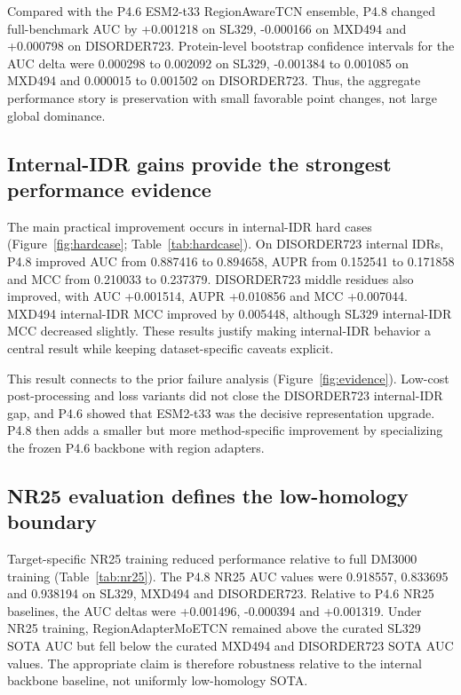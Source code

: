 \documentclass[namedate,webpdf,traditional,large]{oup-authoring-template}
\newcommand{\method}{RegionAdapterMoETCN}
\newcommand{\backbone}{RegionAwareTCN}
\begin{document}
Compared with the P4.6 ESM2-t33 \backbone{} ensemble, P4.8 changed full-benchmark AUC by +0.001218 on SL329, -0.000166 on MXD494 and +0.000798 on DISORDER723. Protein-level bootstrap confidence intervals for the AUC delta were 0.000298 to 0.002092 on SL329, -0.001384 to 0.001085 on MXD494 and 0.000015 to 0.001502 on DISORDER723. Thus, the aggregate performance story is preservation with small favorable point changes, not large global dominance.

\subsection{Internal-IDR gains provide the strongest performance evidence}

The main practical improvement occurs in internal-IDR hard cases (Figure~\ref{fig:hardcase}; Table~\ref{tab:hardcase}). On DISORDER723 internal IDRs, P4.8 improved AUC from 0.887416 to 0.894658, AUPR from 0.152541 to 0.171858 and MCC from 0.210033 to 0.237379. DISORDER723 middle residues also improved, with AUC +0.001514, AUPR +0.010856 and MCC +0.007044. MXD494 internal-IDR MCC improved by 0.005448, although SL329 internal-IDR MCC decreased slightly. These results justify making internal-IDR behavior a central result while keeping dataset-specific caveats explicit.

This result connects to the prior failure analysis (Figure~\ref{fig:evidence}). Low-cost post-processing and loss variants did not close the DISORDER723 internal-IDR gap, and P4.6 showed that ESM2-t33 was the decisive representation upgrade. P4.8 then adds a smaller but more method-specific improvement by specializing the frozen P4.6 backbone with region adapters.

\subsection{NR25 evaluation defines the low-homology boundary}

Target-specific NR25 training reduced performance relative to full DM3000 training (Table~\ref{tab:nr25}). The P4.8 NR25 AUC values were 0.918557, 0.833695 and 0.938194 on SL329, MXD494 and DISORDER723. Relative to P4.6 NR25 baselines, the AUC deltas were +0.001496, -0.000394 and +0.001319. Under NR25 training, \method{} remained above the curated SL329 SOTA AUC but fell below the curated MXD494 and DISORDER723 SOTA AUC values. The appropriate claim is therefore robustness relative to the internal backbone baseline, not uniformly low-homology SOTA.
\end{document}

